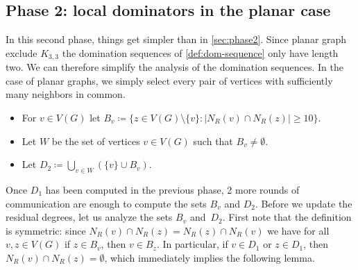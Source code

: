 \subsection{Phase 2: local dominators in the planar case}\label{sec:D2}

In this second phase, things get simpler than in \cref{sec:phase2}. Since
planar graph exclude $K_{3,3}$ the domination sequences of \cref{def:dom-sequence} only have
length two. We can therefore simplify the analysis of the domination sequences.
In the case of planar graphs, we simply select every pair
of vertices with sufficiently many neighbors in common.


\begin{tcolorbox}[colback=red!5!white,colframe=red!50!black]
\begin{itemize}
\item For $v\in V(G)$ let
  $B_v\coloneqq \{z\in V(G)\setminus \{v\}: |N_R(v)\cap N_R(z)|\geq
  10\}$.\smallskip
\item Let $W$ be the set of vertices $v\in V(G)$ such that
  $B_v \neq \emptyset$.\smallskip
\item Let $D_2\coloneqq \bigcup\limits_{v\in W} (\{v\}\cup B_v)$.
\end{itemize}
\end{tcolorbox}

Once $D_1$ has been computed in the previous phase, 2 more rounds of
communication are enough to compute the sets $B_v$ and $D_2$.
%
Before we update the residual degrees, let us analyze the sets $B_v$
and~$D_2$.  First note that the definition is symmetric: since
$N_R(v)\cap N_R(z)=N_R(z)\cap N_R(v)$ we have for all $v,z\in V(G)$ if
$z\in B_v$, then $v\in B_z$. In particular, if $v\in D_1$ or
$z\in D_1$, then $N_R(v)\cap N_R(z)=\emptyset$, which immediately
implies the following lemma.

